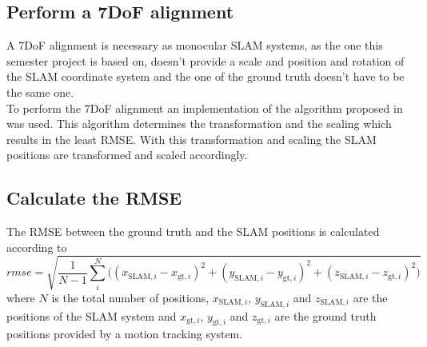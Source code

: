 \subsection{Perform a 7DoF alignment}
A 7DoF alignment is necessary as monocular \ac{SLAM} systems, as the one this semester project is based on, doesn't provide a scale and position and rotation of the \ac{SLAM} coordinate system and the one of the ground truth doesn't have to be the same one.\\

To perform the 7DoF alignment an implementation of the algorithm proposed in \cite{Umeyama1991} was used. This algorithm determines the transformation and the scaling which results in the least \ac{RMSE}. With this transformation and scaling the \ac{SLAM} positions are transformed and scaled accordingly.

\subsection{Calculate the \acf{RMSE}}
The \acf{RMSE} between the ground truth and the \ac{SLAM} positions is calculated according to
\begin{equation}
  \textit{rmse} = \sqrt{\frac{1}{N - 1} \sum_i^N \big( (x_{\text{SLAM},i} - x_{\text{gt},i})^2 + (y_{\text{SLAM},i} - y_{\text{gt},i})^2 + (z_{\text{SLAM},i} - z_{\text{gt},i})^2\big)}
\end{equation}
where $N$ is the total number of positions, $x_{\text{SLAM},i}$, $y_{\text{SLAM},i}$ and $z_{\text{SLAM},i}$ are the positions of the \ac{SLAM} system and $x_{\text{gt},i}$, $y_{\text{gt},i}$ and $z_{\text{gt},i}$ are the ground truth positions provided by a motion tracking system.
